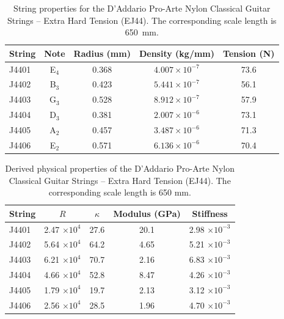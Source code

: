  \begin{table}[htbp]
  \centering
  \caption{\label{tbl:ej44_mks} String properties for the D'Addario Pro-Arte Nylon Classical Guitar Strings -- Extra Hard Tension (EJ44). The corresponding scale length is 650~mm.}
    \begin{tabular}{lcccc}
    \hline \hline
    String  & Note  & \multicolumn{1}{l}{Radius (mm)} & \multicolumn{1}{l}{Density (kg/mm)} & \multicolumn{1}{l}{Tension (N)} \\
    \hline
    J4401 & E$_4$  & 0.368 & $4.007 \times 10^{-7}$ & 73.6 \\
    J4402 & B$_3$  & 0.423 & $5.441 \times 10^{-7}$ & 56.1 \\
    J4403 & G$_3$  & 0.528 & $8.912 \times 10^{-7}$ & 57.9 \\
    J4404 & D$_3$  & 0.381 & $2.007 \times 10^{-6}$ & 73.1 \\
    J4405 & A$_2$  & 0.457 & $3.487 \times 10^{-6}$ & 71.3 \\
    J4406 & E$_2$  & 0.571 & $6.136 \times 10^{-6}$ & 70.4 \\
    \hline
    \end{tabular}%
 \end{table}%

 \begin{table}[htbp]
  \centering
  \caption{\label{tbl:ej44_props} Derived physical properties of the D'Addario Pro-Arte Nylon Classical Guitar Strings -- Extra Hard Tension (EJ44). The corresponding scale length is 650 mm.}
    \begin{tabular}{lcccc}
    \hline \hline
    String  & $R$ & $\kappa$ & Modulus (GPa) & Stiffness \\
    \hline
    J4401 & 2.47 $\times 10^{4}$ & 27.6 & 20.1 & 2.98 $\times 10^{-3}$ \\
    J4402 & 5.64 $\times 10^{4}$ & 64.2 & 4.65 & 5.21 $\times 10^{-3}$ \\
    J4403 & 6.21 $\times 10^{4}$ & 70.7 & 2.16 & 6.83 $\times 10^{-3}$ \\
    J4404 & 4.66 $\times 10^{4}$ & 52.8 & 8.47 & 4.26 $\times 10^{-3}$ \\
    J4405 & 1.79 $\times 10^{4}$ & 19.7 & 2.13 & 3.12 $\times 10^{-3}$ \\
    J4406 & 2.56 $\times 10^{4}$ & 28.5 & 1.96 & 4.70 $\times 10^{-3}$ \\
    \hline
    \end{tabular}%
 \end{table}%

